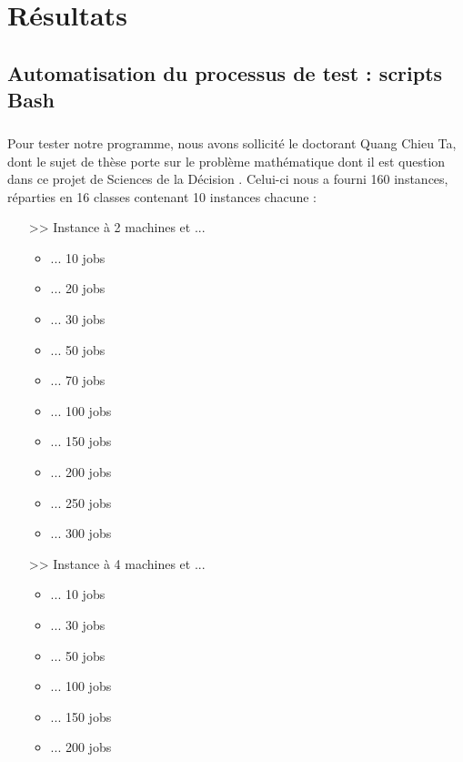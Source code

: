 \chapter{Résultats}


\section{Automatisation du processus de test : scripts Bash}

\paragraph{}
Pour tester notre programme, nous avons sollicité le doctorant Quang Chieu Ta, dont le sujet de thèse
porte sur le problème mathématique dont il est question dans ce projet de \og Sciences de la Décision \fg{}.
Celui-ci nous a fourni 160 instances, réparties en 16 classes contenant 10 instances chacune :
\begin{itemize}
\item[>>] Instance à 2 machines et ...
    \begin{itemize}
    \item ... 10 jobs
    \item ... 20 jobs
    \item ... 30 jobs
    \item ... 50 jobs
    \item ... 70 jobs
    \item ... 100 jobs
    \item ... 150 jobs
    \item ... 200 jobs
    \item ... 250 jobs
    \item ... 300 jobs
    \end{itemize}
\item[>>] Instance à 4 machines et ...
    \begin{itemize}
    \item ... 10 jobs
    \item ... 30 jobs
    \item ... 50 jobs
    \item ... 100 jobs
    \item ... 150 jobs
    \item ... 200 jobs
    \end{itemize}
\end{itemize}

